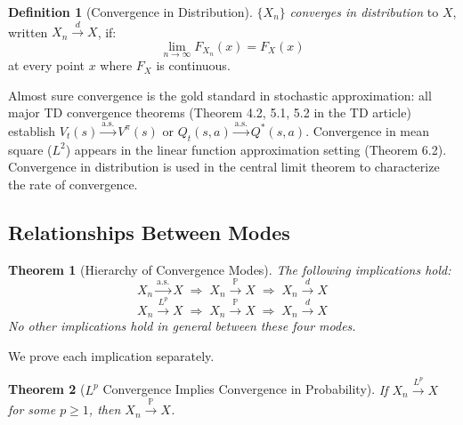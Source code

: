 \documentclass[11pt,a4paper]{article}
\theoremstyle{definition}
\newtheorem{definition}{Definition}[section]
\theoremstyle{plain}
\newtheorem{theorem}{Theorem}[section]
\theoremstyle{remark}
\newcommand{\Prob}{\mathbb{P}}
\newcommand{\cas}{\xrightarrow{\text{a.s.}}}
\newcommand{\cprob}{\xrightarrow{\Prob}}
\newcommand{\clp}[1]{\xrightarrow{L^{#1}}}
\newcommand{\cdist}{\xrightarrow{d}}
\begin{document}
\begin{definition}[Convergence in Distribution]
\label{def:dist_conv}
$\{X_n\}$ \emph{converges in distribution} to $X$, written $X_n \cdist X$, if:
\begin{equation}
    \lim_{n \to \infty} F_{X_n}(x) = F_X(x)
    \label{eq:dist_conv}
\end{equation}
at every point $x$ where $F_X$ is continuous.
\end{definition}

\begin{rlconnection}[Connection to RL]
Almost sure convergence is the gold standard in stochastic approximation: all major TD convergence theorems (Theorem 4.2, 5.1, 5.2 in the TD article) establish $V_t(s) \cas V^\pi(s)$ or $Q_t(s,a) \cas Q^*(s,a)$. Convergence in mean square ($L^2$) appears in the linear function approximation setting (Theorem 6.2). Convergence in distribution is used in the central limit theorem to characterize the rate of convergence.
\end{rlconnection}

\subsection{Relationships Between Modes}
\label{subsec:conv_relations}

\begin{keyresult}
\begin{theorem}[Hierarchy of Convergence Modes]
\label{thm:conv_hierarchy}
The following implications hold:
\begin{equation}
    X_n \cas X \;\Longrightarrow\; X_n \cprob X \;\Longrightarrow\; X_n \cdist X
    \label{eq:hierarchy_1}
\end{equation}
\begin{equation}
    X_n \clp{p} X \;\Longrightarrow\; X_n \cprob X \;\Longrightarrow\; X_n \cdist X
    \label{eq:hierarchy_2}
\end{equation}
No other implications hold in general between these four modes.
\end{theorem}
\end{keyresult}

We prove each implication separately.

\begin{theorem}[$L^p$ Convergence Implies Convergence in Probability]
\label{thm:lp_to_prob}
If $X_n \clp{p} X$ for some $p \geq 1$, then $X_n \cprob X$.
\end{theorem}
\end{document}
